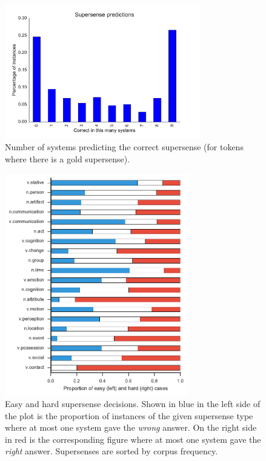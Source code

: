 \documentclass[11pt,letterpaper]{article}
\newcommand{\ensuretext}[1]{#1}
\newcommand{\ajmarker}{\ensuretext{\textcolor{purple}{\ensuremath{^{\textsc{A}}_{\textsc{J}}}}}}
\newcommand{\arkcomment}[3]{\ensuretext{\textcolor{#3}{[#1 #2]}}}
\newcommand{\aj}[1]{\arkcomment{\ajmarker}{#1}{purple}}
\begin{document}
\begin{figure}[ht]
		\includegraphics[width=8.5cm]{figs/supersense_predictions.pdf}
	\caption{Number of systems predicting the correct supersense (for tokens where there is a gold supersense). 
}
	\label{fig:supersense-predictions}
\end{figure}



\begin{figure}
		\includegraphics[width=8cm]{figs/proportion_of_easy_and_hard_supersenses.pdf}
	\caption{Easy and hard supersense decisions. Shown in blue in the left side of the plot is the proportion of instances of the given supersense type where at most one system gave the \emph{wrong} answer. On the right side in red is the corresponding figure where at most one system gave the \emph{right} answer. Supersenses are sorted by corpus frequency.}
	\label{fig:easy-and-hard-supersenses}
\end{figure}
\end{document}
